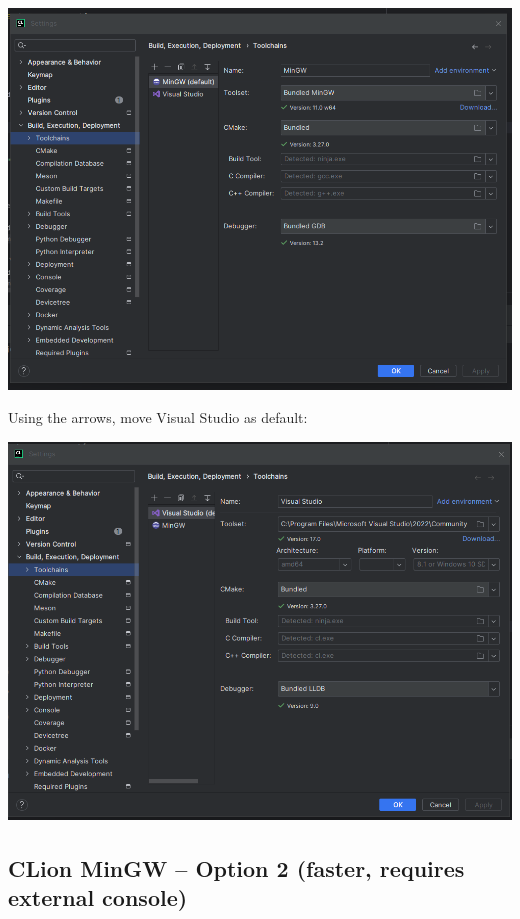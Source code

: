 \documentclass[../en-fa-lab.tex]{subfiles}
\begin{document}
\includegraphics[width=\textwidth,alt={A screenshot of a computer Description automatically generated}]{./Resources/tutorial_lab9/image20.png}

Using the arrows, move Visual Studio as default:

\includegraphics[width=\textwidth,alt={A screenshot of a computer Description automatically generated}]{./Resources/tutorial_lab9/image21.png}

\subsection{CLion MinGW -- Option 2 (faster, requires external
console)}\label{clion-mingw-option-2-faster-requires-external-console}
\end{document}
